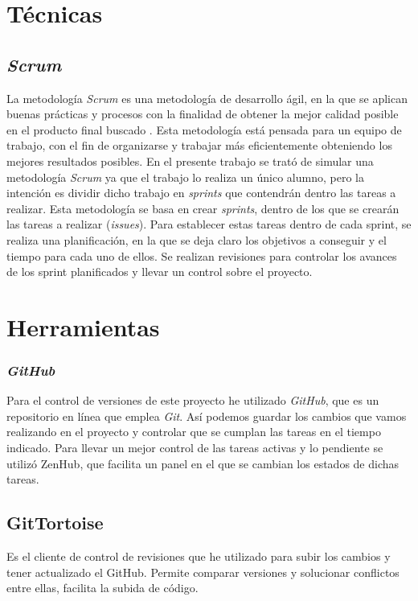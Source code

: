 
\section{Técnicas}

\subsection{\textit{Scrum}}
La metodología \textit{Scrum} es una metodología de desarrollo ágil, en la que se aplican buenas prácticas y procesos con la finalidad de obtener la mejor calidad posible en el producto final buscado \cite{scrum}.\newline
Esta metodología está pensada para un equipo de trabajo, con el fin de organizarse y trabajar más eficientemente obteniendo los mejores resultados posibles. En el presente trabajo se trató de simular una metodología \textit{Scrum} ya que el trabajo lo realiza un único alumno, pero la intención es dividir dicho trabajo en \textit{sprints} que contendrán dentro las tareas a realizar.\newline
Esta metodología se basa en crear \textit{sprints}, dentro de los que se crearán las tareas a realizar (\textit{issues}). Para establecer estas tareas dentro de cada sprint, se realiza una planificación, en la que se deja claro los objetivos a conseguir y el tiempo para cada uno de ellos. 
Se realizan revisiones para controlar los avances de los sprint planificados y llevar un control sobre el proyecto.



\section{Herramientas}
\subsubsection{\textit{GitHub}}
Para el control de versiones de este proyecto he utilizado \textit{GitHub}, que es un repositorio en línea que emplea \textit{Git}. Así podemos guardar los cambios que vamos realizando en el proyecto y controlar que se cumplan las tareas en el tiempo indicado. Para llevar un mejor control de las tareas activas y lo pendiente se utilizó ZenHub, que facilita un panel en el que se cambian los estados de dichas tareas. 

\subsection{GitTortoise}
Es el cliente de control de revisiones que he utilizado para subir los cambios y tener actualizado el GitHub. Permite comparar versiones y solucionar conflictos entre ellas, facilita la subida de código.\cite{wiki:gitTortoise}
